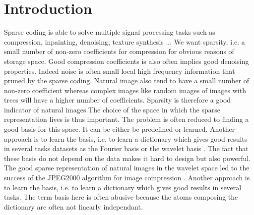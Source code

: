 \documentclass[a4paper,11pt]{article}
\begin{document}
\section{Introduction}
Sparse coding is able to solve multiple signal processing tasks such as compression, inpainting, denoising, texture synthesis ...
We want sparsity, i.e. a small number of non-zero coefficients for compression for obvious reasons of storage space.
Good compression coefficients is also often implies good denoising properties.
Indeed noise is often small local high frequency information that pruned by the sparse coding.
Natural image also tend to have a small number of non-zero coefficient whereas complex images like
random images of images with trees will have a higher number of coefficients.
Sparsity is therefore a good indicator of natural images
The choice of the space in which the sparse representation lives is thus important.
The problem is often reduced to finding a good basis for this space.
It can be either be predefined or learned.
Another approach is to learn the basis, i.e. to learn a dictionary which gives good results in several tasks datasets as the Fourier basis or the wavelet basis \cite{mallat1999}.
The fact that these basis do not depend on the data makes it hard to design but also powerful.
The good sparse representation of natural images in the wavelet space led to the success of the JPEG2000 algorithm for image compression \cite{marcellin00}.
Another approach is to learn the basis, i.e. to learn a dictionary which gives good results in several tasks.
The term basis here is often abusive because the atoms composing the dictionary are often not linearly independant.


\end{document}
